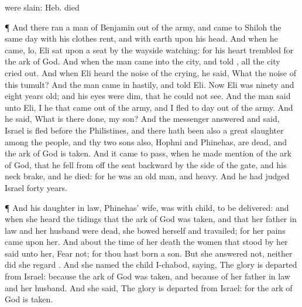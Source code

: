 {{were slain: Heb. died}
\par }{\PP {}¶ And there
ran a
man of
Benjamin out of the
army, and
came to
Shiloh the same
day with his
clothes
rent, and with
earth upon his
head.
And when he
came, lo,
Eli
sat upon a
seat by the
wayside
watching: for his
heart
trembled for the
ark of
God. And when the
man
came into the
city, and
told
{}, all the
city cried
out.
And when
Eli
heard the
noise of the
crying, he
said, What
{} the
noise of this
tumult? And the
man
came in
hastily, and
told
Eli.
Now
Eli was
ninety and
eight
years
old; and his
eyes were
dim, that he
could not
see.
And the
man
said unto
Eli, I
{} he that
came out of the
army, and I
fled to
day out of the
army. And he
said, What is there
done, my
son?
And the
messenger
answered and
said,
Israel is
fled
before the
Philistines, and there hath been also a
great
slaughter among the
people, and thy
two
sons also,
Hophni and
Phinehas, are
dead, and the
ark of
God is
taken.
And it came to pass, when he made
mention of the
ark of
God, that he
fell from off the
seat
backward
by the
side of the
gate, and his
neck
brake, and he
died: for he was an
old
man, and
heavy. And he had
judged
Israel
forty
years.
\par }{\PP {}¶ And his daughter in
law,
Phinehas’
wife, was with
child,
{} to be
delivered: and when she
heard the
tidings
that the
ark of
God was
taken, and that her father in
law and her
husband were
dead, she
bowed herself and
travailed; for her
pains
came upon her.
And about the
time of her
death the women that
stood by her
said unto her,
Fear not; for thou hast
born a
son. But she
answered not, neither did she
regard
{}.
And she
named the
child
I-chabod,
saying, The
glory is
departed from
Israel:
because the
ark of
God was
taken, and because of her father in
law and her
husband.
And she
said, The
glory is
departed from
Israel: for the
ark of
God is
taken.

}
